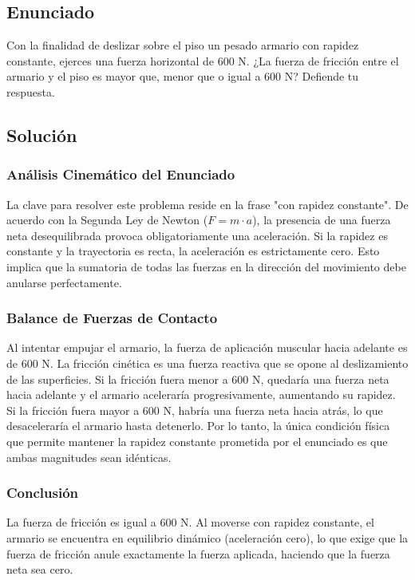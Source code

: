 \documentclass[12pt,letterpaper]{article}
\begin{document}
\newpage

\subsection*{Enunciado}
Con la finalidad de deslizar sobre el piso un pesado armario con rapidez constante, ejerces una fuerza horizontal de $600\text{ N}$. ¿La fuerza de fricción entre el armario y el piso es mayor que, menor que o igual a $600\text{ N}$? Defiende tu respuesta.

\subsection*{Solución}

\subsubsection*{Análisis Cinemático del Enunciado}
La clave para resolver este problema reside en la frase "con rapidez constante". De acuerdo con la Segunda Ley de Newton ($F = m \cdot a$), la presencia de una fuerza neta desequilibrada provoca obligatoriamente una aceleración. Si la rapidez es constante y la trayectoria es recta, la aceleración es estrictamente cero. Esto implica que la sumatoria de todas las fuerzas en la dirección del movimiento debe anularse perfectamente.

\subsubsection*{Balance de Fuerzas de Contacto}
Al intentar empujar el armario, la fuerza de aplicación muscular hacia adelante es de $600\text{ N}$. La fricción cinética es una fuerza reactiva que se opone al deslizamiento de las superficies.
Si la fricción fuera menor a $600\text{ N}$, quedaría una fuerza neta hacia adelante y el armario aceleraría progresivamente, aumentando su rapidez.
Si la fricción fuera mayor a $600\text{ N}$, habría una fuerza neta hacia atrás, lo que desaceleraría el armario hasta detenerlo.
Por lo tanto, la única condición física que permite mantener la rapidez constante prometida por el enunciado es que ambas magnitudes sean idénticas.

\subsubsection*{Conclusión}
La fuerza de fricción es igual a $600\text{ N}$. Al moverse con rapidez constante, el armario se encuentra en equilibrio dinámico (aceleración cero), lo que exige que la fuerza de fricción anule exactamente la fuerza aplicada, haciendo que la fuerza neta sea cero.
\end{document}
